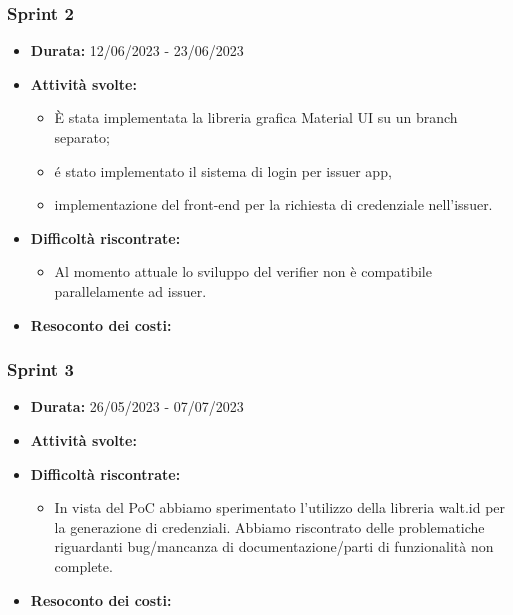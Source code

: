 \subsubsection{Sprint 2}
\begin{itemize}
    \item \textbf{Durata:} 12/06/2023 - 23/06/2023 
    \item \textbf{Attività svolte:}
    \begin{itemize}
        \item È stata implementata la libreria grafica Material UI su un branch separato;
        \item é stato implementato il sistema di login per issuer app, 
        \item implementazione del front-end per la richiesta di credenziale nell'issuer.
    \end{itemize}
    \item \textbf{Difficoltà riscontrate:}
    \begin{itemize}
        \item Al momento attuale lo sviluppo del verifier non è compatibile parallelamente ad issuer.
    \end{itemize}
    \item \textbf{Resoconto dei costi:}
    \end{itemize}

\subsubsection{Sprint 3}
\begin{itemize}
    \item \textbf{Durata:} 26/05/2023 - 07/07/2023 
    \item \textbf{Attività svolte:} 
    \item \textbf{Difficoltà riscontrate:}
    \begin{itemize}
        \item In vista del PoC abbiamo sperimentato l’utilizzo della libreria walt.id per la generazione di credenziali.
        Abbiamo riscontrato delle problematiche riguardanti bug/mancanza di documentazione/parti di funzionalità non complete.
    \end{itemize}
    \item \textbf{Resoconto dei costi:}
    \end{itemize}

